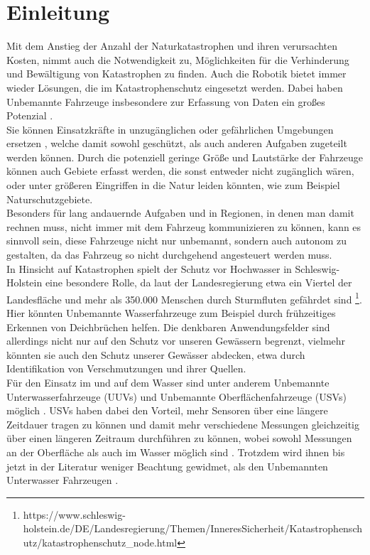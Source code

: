 \documentclass[conference]{IEEEtran}
\begin{document}
\section{Einleitung}
Mit dem Anstieg der Anzahl der Naturkatastrophen und ihren verursachten Kosten\cite{b1}, nimmt auch die Notwendigkeit zu,  Möglichkeiten für die Verhinderung und Bewältigung von Katastrophen zu finden. Auch die Robotik bietet immer wieder Lösungen, die im Katastrophenschutz eingesetzt werden. Dabei haben Unbemannte Fahrzeuge insbesondere zur Erfassung von Daten ein großes Potenzial \cite{b2}.\\
Sie können Einsatzkräfte in unzugänglichen oder gefährlichen Umgebungen ersetzen \cite{b3}, welche damit sowohl geschützt, als auch anderen Aufgaben zugeteilt werden können.  Durch die potenziell geringe Größe und Lautstärke der Fahrzeuge können auch Gebiete erfasst werden, die sonst entweder nicht zugänglich wären, oder unter größeren Eingriffen in die Natur leiden könnten, wie zum Beispiel Naturschutzgebiete.\\
Besonders für lang andauernde Aufgaben und in Regionen, in denen man damit rechnen muss, nicht immer mit dem Fahrzeug kommunizieren zu können, kann es sinnvoll sein, diese Fahrzeuge nicht nur unbemannt, sondern auch autonom zu gestalten, da das Fahrzeug so nicht durchgehend angesteuert werden muss.\\
In Hinsicht auf Katastrophen spielt der Schutz vor Hochwasser in Schleswig-Holstein eine besondere Rolle, da laut der Landesregierung etwa ein Viertel der Landesfläche und mehr als 350.000 Menschen durch Sturmfluten gefährdet sind \footnote{https://www.schleswig-holstein.de/DE/Landesregierung/Themen/InneresSicherheit/Katastrophenschutz/katastrophenschutz\_node.html}. Hier könnten Unbemannte Wasserfahrzeuge zum Beispiel durch frühzeitiges Erkennen von Deichbrüchen helfen. Die denkbaren Anwendungsfelder sind allerdings nicht nur auf den Schutz vor unseren Gewässern begrenzt, vielmehr könnten sie auch den Schutz unserer Gewässer abdecken, etwa durch Identifikation von Verschmutzungen und ihrer Quellen.\\
Für den Einsatz im und auf dem Wasser sind unter anderem Unbemannte Unterwasserfahrzeuge (UUVs) und Unbemannte Oberflächenfahrzeuge (USVs) möglich \cite{b2}. USVs haben dabei den Vorteil, mehr Sensoren über eine längere Zeitdauer tragen zu können und damit mehr verschiedene Messungen gleichzeitig über einen längeren Zeitraum durchführen zu können, wobei sowohl Messungen an der Oberfläche als auch im Wasser möglich sind \cite{b5}. Trotzdem wird ihnen bis jetzt in der Literatur weniger Beachtung gewidmet, als den Unbemannten Unterwasser Fahrzeugen \cite{b2}.\\
\end{document}

